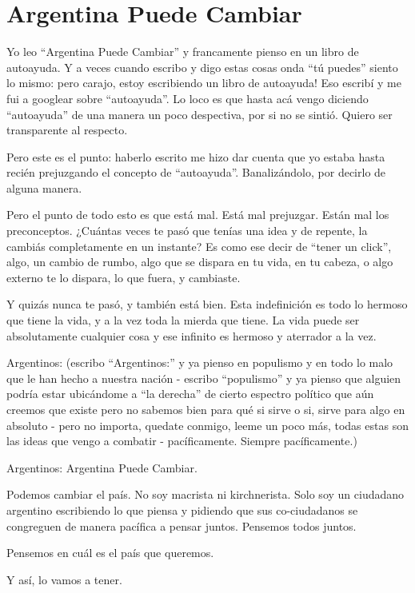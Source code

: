 \documentclass[
]{book}
\begin{document}
\hypertarget{argentina-puede-cambiar}{%
\section{Argentina Puede Cambiar}\label{argentina-puede-cambiar}}

Yo leo ``Argentina Puede Cambiar'' y francamente pienso en un libro de autoayuda. Y a veces cuando escribo y digo estas cosas onda ``tú puedes'' siento lo mismo: pero carajo, estoy escribiendo un libro de autoayuda! Eso escribí y me fui a googlear sobre ``autoayuda''. Lo loco es que hasta acá vengo diciendo ``autoayuda'' de una manera un poco despectiva, por si no se sintió. Quiero ser transparente al respecto.

Pero este es el punto: haberlo escrito me hizo dar cuenta que yo estaba hasta recién prejuzgando el concepto de ``autoayuda''. Banalizándolo, por decirlo de alguna manera.

Pero el punto de todo esto es que está mal. Está mal prejuzgar. Están mal los preconceptos. ¿Cuántas veces te pasó que tenías una idea y de repente, la cambiás completamente en un instante? Es como ese decir de ``tener un click'', algo, un cambio de rumbo, algo que se dispara en tu vida, en tu cabeza, o algo externo te lo dispara, lo que fuera, y cambiaste.

Y quizás nunca te pasó, y también está bien. Esta indefinición es todo lo hermoso que tiene la vida, y a la vez toda la mierda que tiene. La vida puede ser absolutamente cualquier cosa y ese infinito es hermoso y aterrador a la vez.

Argentinos: (escribo ``Argentinos:'' y ya pienso en populismo y en todo lo malo que le han hecho a nuestra nación - escribo ``populismo'' y ya pienso que alguien podría estar ubicándome a ``la derecha'' de cierto espectro político que aún creemos que existe pero no sabemos bien para qué si sirve o si, sirve para algo en absoluto - pero no importa, quedate conmigo, leeme un poco más, todas estas son las ideas que vengo a combatir - pacíficamente. Siempre pacíficamente.)

Argentinos: Argentina Puede Cambiar.

Podemos cambiar el país. No soy macrista ni kirchnerista. Solo soy un ciudadano argentino escribiendo lo que piensa y pidiendo que sus co-ciudadanos se congreguen de manera pacífica a pensar juntos. Pensemos todos juntos.

Pensemos en cuál es el país que queremos.

Y así, lo vamos a tener.
\end{document}

